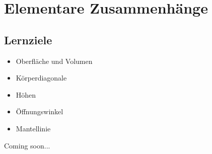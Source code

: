 \section{Elementare Zusammenhänge}
\sectuntertitel{}


\subsection*{Lernziele}
\begin{itemize}
\item Oberfläche und Volumen
\item Körperdiagonale
\item Höhen
\item Öffnungswinkel
\item Mantellinie
\end{itemize}

Coming soon...
\newpage
